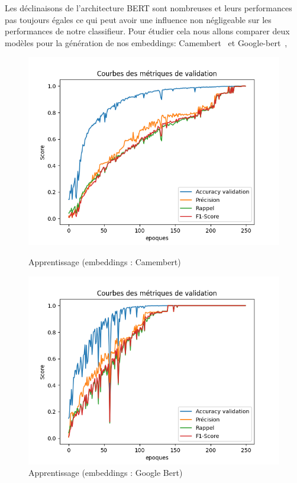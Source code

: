 \documentclass[12pt]{article}
\begin{document}
Les déclinaisons de l'architecture BERT sont nombreuses et leurs performances pas toujours égales ce qui peut avoir une influence non négligeable sur 
les performances de notre classifieur. Pour étudier cela nous allons comparer deux modèles pour la génération de nos embeddings: 
Camembert~\cite{DBLP:journals/corr/abs-1911-03894} et Google-bert~\cite{devlin2019bertpretrainingdeepbidirectional},
\begin{figure}[h]
    \centering
    \begin{minipage}[b]{0.38\textwidth}
        \centering
        \includegraphics[width=\textwidth]{static/mdl_camembert.png} 
        \caption{Apprentissage (embeddings : Camembert)}
        \label{fig:camenbert}
    \end{minipage}
    \hfill
    \begin{minipage}[b]{0.38\textwidth}
        \centering
        \includegraphics[width=\textwidth]{static/mdl_google_bert.png} 
        \caption{Apprentissage (embeddings : Google Bert)}
        \label{fig:google_bert}
    \end{minipage}
\end{figure}
\end{document}
